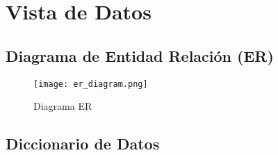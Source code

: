 \section{Vista de Datos} \label{vistaDatos}

\subsection{Diagrama de Entidad Relación (ER)}
\begin{figure}[H]
    \texttt{[image: er\_diagram.png]}
    \caption{Diagrama ER}
    \label{fig:er_diagram}
    \centering
\end{figure}

\subsection{Diccionario de Datos}
